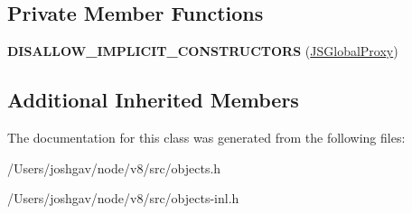 \subsection*{Private Member Functions}
\begin{DoxyCompactItemize}
\item 
{\bfseries D\+I\+S\+A\+L\+L\+O\+W\+\_\+\+I\+M\+P\+L\+I\+C\+I\+T\+\_\+\+C\+O\+N\+S\+T\+R\+U\+C\+T\+O\+RS} (\hyperlink{classv8_1_1internal_1_1_j_s_global_proxy}{J\+S\+Global\+Proxy})\hypertarget{classv8_1_1internal_1_1_j_s_global_proxy_ada9be16733431e2ea7244a641835a99e}{}\label{classv8_1_1internal_1_1_j_s_global_proxy_ada9be16733431e2ea7244a641835a99e}

\end{DoxyCompactItemize}
\subsection*{Additional Inherited Members}


The documentation for this class was generated from the following files\+:\begin{DoxyCompactItemize}
\item 
/\+Users/joshgav/node/v8/src/objects.\+h\item 
/\+Users/joshgav/node/v8/src/objects-\/inl.\+h\end{DoxyCompactItemize}
